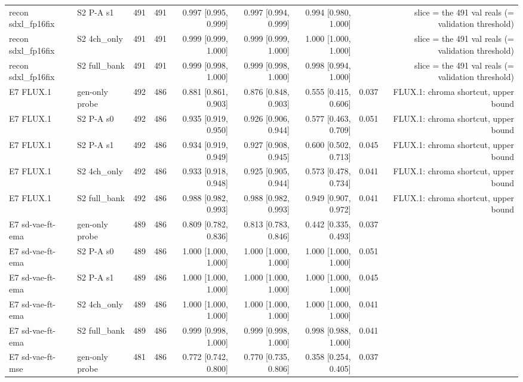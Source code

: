 \begin{table}[htbp]
\begin{tabular}{llrrrrrrr}
recon sdxl\_fp16fix & S2 P-A s1 & 491 & 491 & 0.997 [0.995, 0.999] & 0.997 [0.994, 0.999] & 0.994 [0.980, 1.000] &  & slice = the 491 val reals (= validation threshold) \\
recon sdxl\_fp16fix & S2 4ch\_only & 491 & 491 & 0.999 [0.999, 1.000] & 0.999 [0.999, 1.000] & 1.000 [1.000, 1.000] &  & slice = the 491 val reals (= validation threshold) \\
recon sdxl\_fp16fix & S2 full\_bank & 491 & 491 & 0.999 [0.998, 1.000] & 0.999 [0.998, 1.000] & 0.998 [0.994, 1.000] &  & slice = the 491 val reals (= validation threshold) \\
E7 FLUX.1 & gen-only probe & 492 & 486 & 0.881 [0.861, 0.903] & 0.876 [0.848, 0.903] & 0.555 [0.415, 0.606] & 0.037 & FLUX.1: chroma shortcut, upper bound \\
E7 FLUX.1 & S2 P-A s0 & 492 & 486 & 0.935 [0.919, 0.950] & 0.926 [0.906, 0.944] & 0.577 [0.463, 0.709] & 0.051 & FLUX.1: chroma shortcut, upper bound \\
E7 FLUX.1 & S2 P-A s1 & 492 & 486 & 0.934 [0.919, 0.949] & 0.927 [0.908, 0.945] & 0.600 [0.502, 0.713] & 0.045 & FLUX.1: chroma shortcut, upper bound \\
E7 FLUX.1 & S2 4ch\_only & 492 & 486 & 0.933 [0.918, 0.948] & 0.925 [0.905, 0.944] & 0.573 [0.478, 0.734] & 0.041 & FLUX.1: chroma shortcut, upper bound \\
E7 FLUX.1 & S2 full\_bank & 492 & 486 & 0.988 [0.982, 0.993] & 0.988 [0.982, 0.993] & 0.949 [0.907, 0.972] & 0.041 & FLUX.1: chroma shortcut, upper bound \\
E7 sd-vae-ft-ema & gen-only probe & 489 & 486 & 0.809 [0.782, 0.836] & 0.813 [0.783, 0.846] & 0.442 [0.335, 0.493] & 0.037 &  \\
E7 sd-vae-ft-ema & S2 P-A s0 & 489 & 486 & 1.000 [1.000, 1.000] & 1.000 [1.000, 1.000] & 1.000 [1.000, 1.000] & 0.051 &  \\
E7 sd-vae-ft-ema & S2 P-A s1 & 489 & 486 & 1.000 [1.000, 1.000] & 1.000 [1.000, 1.000] & 1.000 [1.000, 1.000] & 0.045 &  \\
E7 sd-vae-ft-ema & S2 4ch\_only & 489 & 486 & 1.000 [1.000, 1.000] & 1.000 [1.000, 1.000] & 1.000 [1.000, 1.000] & 0.041 &  \\
E7 sd-vae-ft-ema & S2 full\_bank & 489 & 486 & 0.999 [0.998, 1.000] & 0.999 [0.998, 1.000] & 0.998 [0.988, 1.000] & 0.041 &  \\
E7 sd-vae-ft-mse & gen-only probe & 481 & 486 & 0.772 [0.742, 0.800] & 0.770 [0.735, 0.806] & 0.358 [0.254, 0.405] & 0.037 &  \\

\end{tabular}
\end{table}
